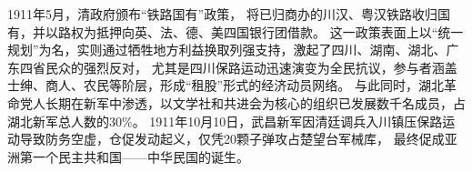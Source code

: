 1911年5月，清政府颁布``铁路国有''政策，
将已归商办的川汉、粤汉铁路收归国有，并以路权为抵押向英、法、德、美四国银行团借款。
这一政策表面上以``统一规划''为名，实则通过牺牲地方利益换取列强支持，激起了四川、湖南、湖北、广东四省民众的强烈反对，
尤其是四川保路运动迅速演变为全民抗议，参与者涵盖士绅、商人、农民等阶层，形成``租股''形式的经济动员网络。
\autocite{zhihu}
与此同时，湖北革命党人长期在新军中渗透，以文学社和共进会为核心的组织已发展数千名成员，占湖北新军总人数的30\%。
1911年10月10日，武昌新军因清廷调兵入川镇压保路运动导致防务空虚，仓促发动起义，仅凭20颗子弹攻占楚望台军械库，
最终促成亚洲第一个民主共和国——中华民国的诞生。